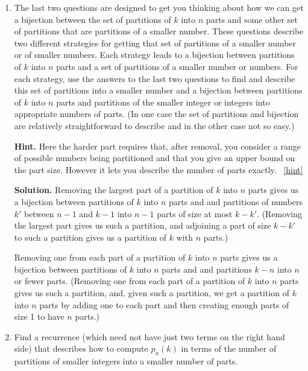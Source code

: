 \documentclass{book}
\begin{document}
\begin{activity}[]
\begin{enumerate}[font=\bfseries,label=(\alph*),ref=\alph*]
\item\label{task-222} \hypertarget{p-1177}{}%
The last two questions are designed to get you thinking about how we can get a bijection between the set of partitions of \(k\) into \(n\) parts and some other set of partitions that are partitions of a smaller number.  These questions describe two different strategies for getting that set of partitions of a smaller number or of smaller numbers.  Each strategy leads to a bijection between partitions of \(k\) into \(n\) parts and a set of partitions of a smaller number or numbers.  For each strategy, use the answers to the last two questions to find and describe this set of partitions into a smaller number and a bijection between partitions of \(k\) into \(n\) parts and partitions of the smaller integer or integers into appropriate numbers of parts. (In one case the set of partitions and bijection are relatively straightforward to describe and in the other case not so easy.)%
\par\smallskip%
\noindent\textbf{Hint.}\hypertarget{hint-136}{}\quad%
\hypertarget{p-1178}{}%
Here the harder part requires that, after removal, you consider a range of possible numbers being partitioned and that you give an upper bound on the part size. However it lets you describe the number of parts exactly.%
~\hfill{\tiny\hyperlink{a-215.c}{[hint]}\hypertarget{q-215.c}{}}\par\smallskip%
\noindent\textbf{Solution.}\hypertarget{solution-117}{}\quad%
\hypertarget{p-1179}{}%
Removing the largest part of a partition of \(k\) into \(n\) parts gives us a bijection between partitions of \(k\) into \(n\) parts and and partitions of numbers \(k'\) between \(n-1\) and \(k-1\) into \(n-1\) parts of size at most \(k-k'\). (Removing the largest part gives us such a partition, and adjoining a part of size \(k-k'\) to such a partition gives us a partition of \(k\) with \(n\) parts.)%
\par
\hypertarget{p-1180}{}%
Removing one from each part of a partition of \(k\) into \(n\) parts gives us a bijection between partitions of \(k\) into \(n\) parts and and partitions \(k-n\) into \(n\) or fewer parts. (Removing one from each part of a partition of \(k\) into \(n\) parts gives us such a partition, and, given such a partition, we get a partition of \(k\) into \(n\) parts by adding one to each part and then creating enough parts of size 1 to have \(n\) parts.)%
\item\label{task-223} \hypertarget{p-1181}{}%
Find a recurrence (which need not have just two terms on the right hand side) that describes how to compute \(p_n(k)\) in terms of the number of partitions of smaller integers into a smaller number of parts.%

\end{enumerate}
\end{activity}
\end{document}
